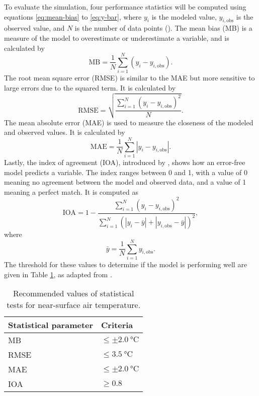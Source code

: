 	To evaluate the simulation, four performance statistics will be computed using equations \ref{eq:mean-bias} to \ref{eq:y-bar},
		where $y_i$ is the modeled value, $y_{i,\text{obs}}$ is the observed value, and $N$ is the number of data points (\cite{Bilang2022}).
	The mean bias (MB) is a measure of the model to overestimate or underestimate a variable, and is calculated by
	\begin{equation}
		\text{MB} =
			\frac{1}{N}
			\sum_{i=1}^{N}
			(y_i - y_{i,\text{obs}}).
			\label{eq:mean-bias}
	\end{equation}
	The root mean square error (RMSE) is similar to the MAE but more sensitive to large errors due to the squared term.
	It is calculated by
	\begin{equation}
		\text{RMSE} =
			\sqrt{
				\frac{
					\sum_{i=1}^{N}
					(y_i - y_{i,\text{obs}}) ^ 2
				}{N}
			}.
			\label{eq:root-mean-square-error}
	\end{equation}
	The mean absolute error (MAE) is used to measure the closeness of the modeled and observed values.
	It is calculated by
	\begin{equation}
		\text{MAE} =
			\frac{1}{N}
			\sum_{i=1}^{N} 
			|y_i - y_{i,\text{obs}}|. \label{eq:mean-absolute-error}
	\end{equation}
	Lastly, the index of agreement (IOA), introduced by \textcite{Willmott1980}, shows how an error-free model predicts a variable.
	The index ranges between \num{0} and \num{1},
		with a value of \num{0} meaning no agreement between the model and observed data,
		and a value of \num{1} meaning a perfect match. 
	It is computed as
	\begin{equation}
		\text{IOA} =
			1 - 
			\frac{
				\sum_{i=1}^{N}
				(y_i - y_{i,\text{obs}}) ^ 2
			}{
				\sum_{i=1}^{N} (
					|y_i - \bar{y}| +
					|y_{i,\text{obs}} - \bar{y}|
				)^2
			},
			\label{eq:index-of-agreement}
	\end{equation}
	where
	\begin{equation}
		\bar{y} = 
			\frac{1}{N}
			\sum_{i=1}^{N} y_{i,\text{obs}}.
			\label{eq:y-bar}
	\end{equation}
	The threshold for these values to determine if the model is performing well are given in Table \ref{tab:performance-statistics-threshold}, as adapted from \textcite{Bilang2022}.

	\begin{table}	
		\caption{Recommended values of statistical tests for near-surface air temperature.}
		\label{tab:performance-statistics-threshold}
		\centering
		\begin{tabular}{l l}
			\hline \hline
			Statistical parameter & Criteria\\
			\hline
			MB & $\leq \pm \qty{2.0}{\degreeCelsius}$ \\
			RMSE & $\leq \qty{3.5}{\degreeCelsius}$\\
			MAE & $\leq \pm \qty{2.0}{\degreeCelsius}$\\
			IOA	& $\geq \num{0.8}$\\
			\hline
		\end{tabular}		
	\end{table}

